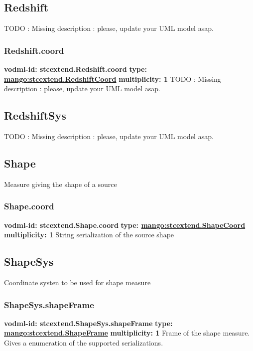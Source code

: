   \subsection{Redshift}
  \label{sect:stcextend.Redshift}
    TODO : Missing description : please, update your UML model asap.

    \subsubsection{Redshift.coord}
      \textbf{vodml-id: stcextend.Redshift.coord} \newline
      \textbf{type: \hyperref[sect:stcextend.RedshiftCoord]{mango:stcextend.RedshiftCoord}} \newline
      \textbf{multiplicity: 1} \newline 
      TODO : Missing description : please, update your UML model asap.

  \subsection{RedshiftSys}
  \label{sect:stcextend.RedshiftSys}
    TODO : Missing description : please, update your UML model asap.

  \subsection{Shape}
  \label{sect:stcextend.Shape}
    Measure giving the shape of a source

    \subsubsection{Shape.coord}
      \textbf{vodml-id: stcextend.Shape.coord} \newline
      \textbf{type: \hyperref[sect:stcextend.ShapeCoord]{mango:stcextend.ShapeCoord}} \newline
      \textbf{multiplicity: 1} \newline 
      String serialization of the source shape

  \subsection{ShapeSys}
  \label{sect:stcextend.ShapeSys}
    Coordinate systen to be used for shape measure

    \subsubsection{ShapeSys.shapeFrame}
      \textbf{vodml-id: stcextend.ShapeSys.shapeFrame} \newline
      \textbf{type: \hyperref[sect:stcextend.ShapeFrame]{mango:stcextend.ShapeFrame}} \newline
      \textbf{multiplicity: 1} \newline 
      Frame of the shape measure. Gives a enumeration of the supported serializations.

